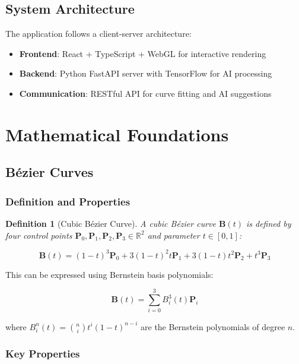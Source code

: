 \documentclass[12pt,a4paper]{article}
\newtheorem{definition}{Definition}
\begin{document}
\subsection{System Architecture}
The application follows a client-server architecture:
\begin{itemize}
    \item \textbf{Frontend}: React + TypeScript + WebGL for interactive rendering
    \item \textbf{Backend}: Python FastAPI server with TensorFlow for AI processing
    \item \textbf{Communication}: RESTful API for curve fitting and AI suggestions
\end{itemize}

\section{Mathematical Foundations}

\subsection{Bézier Curves}

\subsubsection{Definition and Properties}

\begin{definition}[Cubic Bézier Curve]
A cubic Bézier curve $\mathbf{B}(t)$ is defined by four control points $\mathbf{P}_0, \mathbf{P}_1, \mathbf{P}_2, \mathbf{P}_3 \in \mathbb{R}^2$ and parameter $t \in [0,1]$:

\begin{equation}
\mathbf{B}(t) = (1-t)^3\mathbf{P}_0 + 3(1-t)^2t\mathbf{P}_1 + 3(1-t)t^2\mathbf{P}_2 + t^3\mathbf{P}_3
\end{equation}
\end{definition}

This can be expressed using Bernstein basis polynomials:

\begin{equation}
\mathbf{B}(t) = \sum_{i=0}^{3} B_i^3(t)\mathbf{P}_i
\end{equation}

where $B_i^n(t) = \binom{n}{i}t^i(1-t)^{n-i}$ are the Bernstein polynomials of degree $n$.

\subsubsection{Key Properties}
\end{document}
